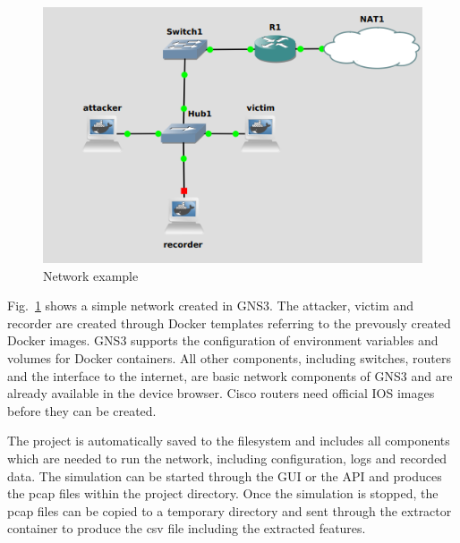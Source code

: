 \documentclass[conference]{IEEEtran}
\begin{document}
\begin{figure}[htbp]
\centerline{\includegraphics[scale=0.5]{network.png}}
\caption{Network example}
\label{network}
\end{figure}

Fig.~\ref{network} shows a simple network created in GNS3. The attacker, victim and recorder are created through Docker templates referring to the prevously created Docker images. GNS3 supports the configuration of environment variables and volumes for Docker containers. All other components, including switches, routers and the interface to the internet, are basic network components of GNS3 and are already available in the device browser. Cisco routers need official IOS images before they can be created.

The project is automatically saved to the filesystem and includes all components which are needed to run the network, including configuration, logs and recorded data. The simulation can be started through the GUI or the API and produces the pcap files within the project directory. Once the simulation is stopped, the pcap files can be copied to a temporary directory and sent through the extractor container to produce the csv file including the extracted features.
\end{document}
